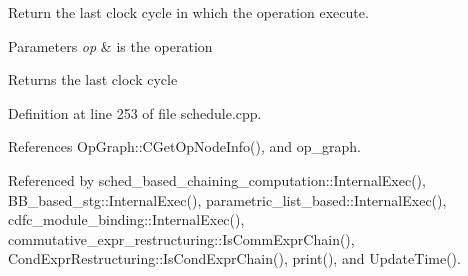 Return the last clock cycle in which the operation execute. 


\begin{DoxyParams}{Parameters}
{\em op} & is the operation \\
\hline
\end{DoxyParams}
\begin{DoxyReturn}{Returns}
the last clock cycle 
\end{DoxyReturn}


Definition at line 253 of file schedule.\+cpp.



References Op\+Graph\+::\+C\+Get\+Op\+Node\+Info(), and op\+\_\+graph.



Referenced by sched\+\_\+based\+\_\+chaining\+\_\+computation\+::\+Internal\+Exec(), B\+B\+\_\+based\+\_\+stg\+::\+Internal\+Exec(), parametric\+\_\+list\+\_\+based\+::\+Internal\+Exec(), cdfc\+\_\+module\+\_\+binding\+::\+Internal\+Exec(), commutative\+\_\+expr\+\_\+restructuring\+::\+Is\+Comm\+Expr\+Chain(), Cond\+Expr\+Restructuring\+::\+Is\+Cond\+Expr\+Chain(), print(), and Update\+Time().

